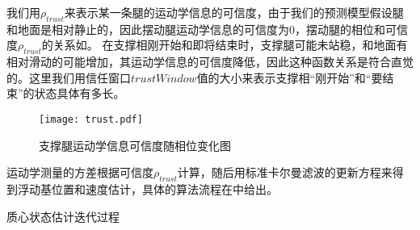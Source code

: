 我们用$\rho_{trust}$来表示某一条腿的运动学信息的可信度，由于我们的预测模型假设腿和地面是相对静止的，因此摆动腿运动学信息的可信度为0，摆动腿的相位和可信度$\rho_{trust}$的关系如。
在支撑相刚开始和即将结束时，支撑腿可能未站稳，和地面有相对滑动的可能增加，其运动学信息的可信度降低，因此这种函数关系是符合直觉的。这里我们用信任窗口$trustWindow$值的大小来表示支撑相“刚开始”和“要结束”的状态具体有多长。
\begin{figure}[htbp]
    \centering
    \texttt{[image: trust.pdf]}
    \caption{\label{fig:kin_trust}支撑腿运动学信息可信度随相位变化图}
\end{figure}

运动学测量的方差根据可信度$\rho_{trust}$计算，随后用标准卡尔曼滤波的更新方程来得到浮动基位置和速度估计，具体的算法流程在中给出。
\begin{algorithm}[htb]
\caption{质心状态估计迭代过程} 
\label{alg:com_state_est} 
\begin{algorithmic}[1] %
\ENDIF
{}
\end{algorithmic}
\end{algorithm}

